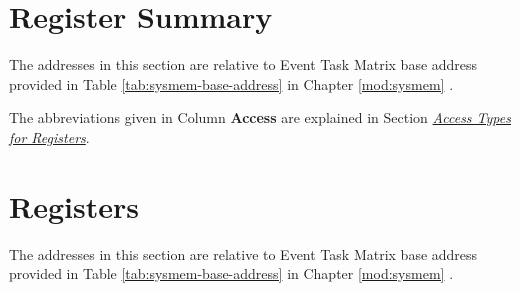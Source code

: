 \documentclass[main\_\_EN.tex]{subfiles}
\begin{document}
\clearpage
\hypertarget{evntaskmatrix-reg-summ}{}
\section{Register Summary}
\label{sec:evntaskmatrix-reg-summ}

The addresses in this section are relative to Event Task Matrix base address provided in Table \ref{tab:sysmem-base-address} in Chapter \ref{mod:sysmem} \textit{}.

The abbreviations given in Column \textbf{Access} are explained in Section \hyperref[glossary-access-types]{\textit{Access Types for Registers}}.






\clearpage
\section{Registers}

The addresses in this section are relative to Event Task Matrix base address provided in Table \ref{tab:sysmem-base-address} in Chapter \ref{mod:sysmem} \textit{}.


\end{document}
